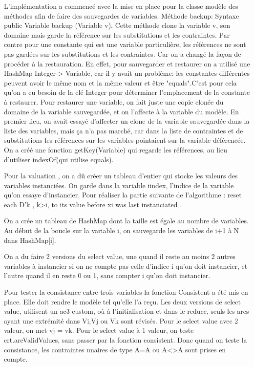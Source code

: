 

L’implémentation  a commencé avec la mise en place  pour la   classe modèle des méthodes  afin de faire  des sauvegardes de variables.
Méthode backup:
Syntaxe  public Variable backup (Variable v).
Cette méthode clone la variable v, son domaine mais garde la référence sur les substitutions et les contraintes.
Par contre pour  une constante qui est une  variable particulière, les références ne sont pas gardées sur les substitutions et les contraintes.
Car on a changé la façon de procéder à la restauration.
En effet, pour sauvegarder et restaurer on a utilisé une HashMap Integer-> Variable, car il y avait un problème: les constantes différentes peuvent avoir le même nom et la même valeur et être "equals".C'est pour cela qu'on a eu besoin de la clé Integer pour déterminer l'emplacement de la constante à restaurer.
Pour restaurer une variable, on fait juste une copie clonée du domaine de la variable sauvegardée, et on l'affecte à la variable du modèle.
En premier lieu, on avait  essayé d'affecter un clone de la variable
sauvegardée dans la liste des variables, mais ça n'a pas marché, car dans la liste de contraintes et de substitutions les références sur les variables
pointaient sur la variable déférencée.
On a créé une fonction getKey(Variable) qui regarde les références, au lieu d'utiliser indexOf(qui utilise equals).


Pour la valuation , on a dû créer un tableau d'entier qui stocke les valeurs des variables instanciées.
On garde dans la variable iindex, l'indice de la variable qu'on essaye
d'instancier.
Pour réaliser la partie suivante de l’algorithme : 
reset each D'k , k>i, to its value before xi was last instanciated .

On a crée un tableau de HashMap dont la taille est égale  au nombre de variables.
 Au début de la boucle sur la variable i, on sauvegarde les variables de
 i+1 à N dans HashMap[i].

 
On a du faire 2 versions du select value, une quand il reste au moins 2 autres variables à instancier si on ne compte pas celle d'indice i qu'on doit instancier, et l'autre quand il en reste 0 ou 1, sans compter i qu'on doit instancier.
     

 Pour tester la consistance entre trois variables  la fonction Consistent a été mis en place. Elle doit rendre le modèle tel qu'elle l'a reçu.
 Les deux versions de  select value, utilisent un ac3 custom, où à l'initialisation et dans le reduce, seuls les arcs ayant une extrémité dans Vi,Vj ou Vk sont révisés.
 Pour le select value avec 2 valeur, on met vj = vk.
Pour le select value à 1 valeur, on teste crt.areValidValues, sans passer par la fonction consistent.
Donc quand on teste la consistance, les contraintes unaires de type A=A ou  A<>A sont prises en compte.

